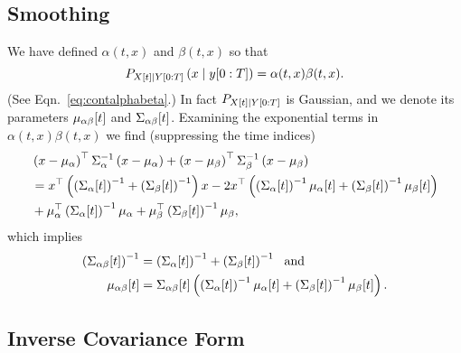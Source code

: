 \subsection{Smoothing}
\label{sec:DetailSmoothing}

We have defined $\alpha(t,x)$ and $\beta(t,x)$ so that
\begin{equation*}
   P_{{X}{[t]}\mid Y[0:T]} \left(x\mid y[0:T] \right) =
   \alpha(t,x) \beta(t,x).
\end{equation*}
(See Eqn.~\eqref{eq:contalphabeta}.)  In fact
$P_{{X}{[t]}\mid Y[0:T]}$ is Gaussian, and we denote its parameters
${\mu_{\alpha \beta}}{[t]}$ and ${\Sigma_{\alpha \beta}}{[t]}$.
Examining the exponential terms in $\alpha(t,x) \beta(t,x)$ we find
(suppressing the time indices)
\begin{align*}
  &\left( x - \mu_\alpha \right)^\top \Sigma_\alpha^{-1} \left( x
    - \mu_\alpha \right) + \left( x - \mu_\beta \right)^\top
  \Sigma_\beta^{-1} \left( x - \mu_\beta \right)\\
  & = x^\top \left( \left( {\Sigma_{\alpha}}{[t]} \right)^{-1} + \left(
      {\Sigma_{\beta}}{[t]} \right)^{-1} \right) x - 2x^\top
  \left( \left( {\Sigma_{\alpha}}{[t]} \right)^{-1}
  {\mu_{\alpha}}{[t]} + \left( {\Sigma_{\beta}}{[t]} \right)^{-1}
  {\mu_{\beta}}{[t]} \right) \\
& + \mu_\alpha^\top  \left(
  {\Sigma_{\alpha}}{[t]} \right)^{-1} \mu_\alpha +
  \mu_\beta^\top  \left( {\Sigma_{\beta}}{[t]} \right)^{-1}
  \mu_\beta ,
\end{align*}
which implies
\begin{subequations}
  \begin{align}
    \left( {\Sigma_{\alpha \beta}}{[t]} \right)^{-1} &= \left(
      {\Sigma_{\alpha}}{[t]} \right)^{-1} + \left(
      {\Sigma_{\beta}}{[t]} \right)^{-1} ~\text{ and} \\
    {\mu_{\alpha \beta}}{[t]} &=
    {\Sigma_{\alpha \beta}}{[t]} \left( \left(
        {\Sigma_{\alpha}}{[t]} \right)^{-1} {\mu_{\alpha}}{[t]} +
      \left( {\Sigma_{\beta}}{[t]} \right)^{-1} {\mu_{\beta}}{[t]}
    \right).
\end{align}
\end{subequations}

\subsection{Inverse Covariance Form}
\label{sec:DetailInverse}

